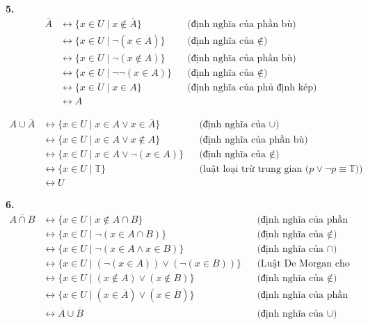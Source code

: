 \documentclass[12pt,a4paper]{article}
\theoremstyle{definition}
\begin{document}
\bigskip
\textbf{5.}
\begin{align*}
\overline{A} &\leftrightarrow \{x \in U \mid x \notin \overline{A}\} && \text{(định nghĩa của phần bù)}\\
&\leftrightarrow \{x \in U \mid \neg(x \in \overline{A})\} && \text{(định nghĩa của $\notin$)}\\
&\leftrightarrow \{x \in U \mid \neg(x \notin A)\} && \text{(định nghĩa của phần bù)}\\
&\leftrightarrow \{x \in U \mid \neg\neg(x \in A)\} && \text{(định nghĩa của $\notin$)}\\
&\leftrightarrow \{x \in U \mid x \in A\} && \text{(định nghĩa của phủ định kép)}\\
&\leftrightarrow A
\end{align*}

\begin{align*}
A \cup \overline{A} &\leftrightarrow \{x \in U \mid x \in A \lor x \in \overline{A}\} && \text{(định nghĩa của $\cup$)}\\
&\leftrightarrow \{x \in U \mid x \in A \lor x \notin A\} && \text{(định nghĩa của phần bù)}\\
&\leftrightarrow \{x \in U \mid x \in A \lor \neg(x \in A)\} && \text{(định nghĩa của $\notin$)}\\
&\leftrightarrow \{x \in U \mid \mathbb{T}\} && \text{(luật loại trừ trung gian ($p \lor \neg p \equiv \mathbb{T}$))}\\
&\leftrightarrow U
\end{align*}

\bigskip
\textbf{6.}
\begin{align*}
\overline{A \cap B} &\leftrightarrow \{x \in U \mid x \notin A \cap B\} && \text{(định nghĩa của phần bù)}\\
&\leftrightarrow \{x \in U \mid \neg(x \in A \cap B)\} && \text{(định nghĩa của $\notin$)}\\
&\leftrightarrow \{x \in U \mid \neg(x \in A \land x \in B)\} && \text{(định nghĩa của $\cap$)}\\
&\leftrightarrow \{x \in U \mid (\neg(x \in A)) \lor (\neg(x \in B))\} && \text{(Luật De Morgan cho logic)}\\
&\leftrightarrow \{x \in U \mid (x \notin A) \lor (x \notin B)\} && \text{(định nghĩa của $\notin$)}\\
&\leftrightarrow \{x \in U \mid (x \in \overline{A}) \lor (x \in \overline{B})\} && \text{(định nghĩa của phần bù)}\\
&\leftrightarrow \overline{A} \cup \overline{B} && \text{(định nghĩa của $\cup$)}
\end{align*}
\end{document}
